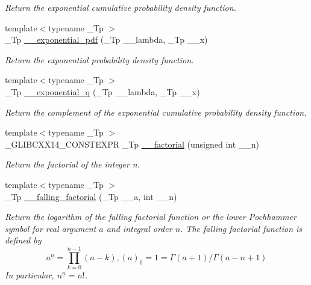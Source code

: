 \begin{DoxyCompactItemize}
\begin{DoxyCompactList}\small\item\em Return the exponential cumulative probability density function. \end{DoxyCompactList}\item 
{\footnotesize template$<$typename \+\_\+\+Tp $>$ }\\\+\_\+\+Tp \hyperlink{namespacestd_1_1____detail_add35fd0c4c00f412c0fab7b6018ce2cd}{\+\_\+\+\_\+exponential\+\_\+pdf} (\+\_\+\+Tp \+\_\+\+\_\+lambda, \+\_\+\+Tp \+\_\+\+\_\+x)
\begin{DoxyCompactList}\small\item\em Return the exponential probability density function. \end{DoxyCompactList}\item 
{\footnotesize template$<$typename \+\_\+\+Tp $>$ }\\\+\_\+\+Tp \hyperlink{namespacestd_1_1____detail_a53b59e7ff7bbe2185cbc153a4a5fd472}{\+\_\+\+\_\+exponential\+\_\+q} (\+\_\+\+Tp \+\_\+\+\_\+lambda, \+\_\+\+Tp \+\_\+\+\_\+x)
\begin{DoxyCompactList}\small\item\em Return the complement of the exponential cumulative probability density function. \end{DoxyCompactList}\item 
{\footnotesize template$<$typename \+\_\+\+Tp $>$ }\\\+\_\+\+G\+L\+I\+B\+C\+X\+X14\+\_\+\+C\+O\+N\+S\+T\+E\+X\+PR \+\_\+\+Tp \hyperlink{namespacestd_1_1____detail_a8de5d6069cbef126684be0800f47f8b2}{\+\_\+\+\_\+factorial} (unsigned int \+\_\+\+\_\+n)
\begin{DoxyCompactList}\small\item\em Return the factorial of the integer n. \end{DoxyCompactList}\item 
{\footnotesize template$<$typename \+\_\+\+Tp $>$ }\\\+\_\+\+Tp \hyperlink{namespacestd_1_1____detail_a62ddf0f8d9467f4c3f2cc0b500ca1272}{\+\_\+\+\_\+falling\+\_\+factorial} (\+\_\+\+Tp \+\_\+\+\_\+a, int \+\_\+\+\_\+n)
\begin{DoxyCompactList}\small\item\em Return the logarithm of the falling factorial function or the lower Pochhammer symbol for real argument $ a $ and integral order $ n $. The falling factorial function is defined by \[ a^{\underline{n}} = \prod_{k=0}^{n-1} (a - k), (a)_0 = 1 = \Gamma(a + 1) / \Gamma(a - n + 1) \] In particular, $ n^{\underline{n}} = n! $. \end{DoxyCompactList}\item 

\end{DoxyCompactItemize}
